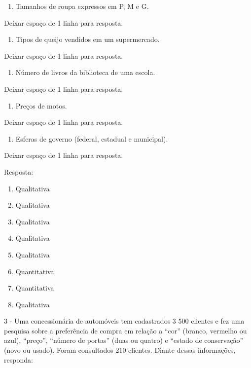 \begin{enumerate}
\def\labelenumi{\alph{enumi})}
\item
  Tamanhos de roupa expressos em P, M e G.
\end{enumerate}

Deixar espaço de 1 linha para resposta.

\begin{enumerate}
\def\labelenumi{\alph{enumi})}
\item
  Tipos de queijo vendidos em um supermercado.
\end{enumerate}

Deixar espaço de 1 linha para resposta.

\begin{enumerate}
\def\labelenumi{\alph{enumi})}
\item
  Número de livros da biblioteca de uma escola.
\end{enumerate}

Deixar espaço de 1 linha para resposta.

\begin{enumerate}
\def\labelenumi{\alph{enumi})}
\item
  Preços de motos.
\end{enumerate}

Deixar espaço de 1 linha para resposta.

\begin{enumerate}
\def\labelenumi{\alph{enumi})}
\item
  Esferas de governo (federal, estadual e municipal).
\end{enumerate}

Deixar espaço de 1 linha para resposta.

Resposta:

\begin{enumerate}
\def\labelenumi{\alph{enumi})}
\item
  Qualitativa
\item
  Qualitativa
\item
  Qualitativa
\item
  Qualitativa
\item
  Qualitativa
\item
  Quantitativa
\item
  Quantitativa
\item
  Qualitativa
\end{enumerate}

3 - Uma concessionária de automóveis tem cadastrados 3 500 clientes e
fez uma pesquisa sobre a preferência de compra em relação a ``cor''
(branco, vermelho ou azul), ``preço'', ``número de portas'' (duas ou
quatro) e ``estado de conservação'' (novo ou usado). Foram consultados
210 clientes. Diante dessas informações, responda:

